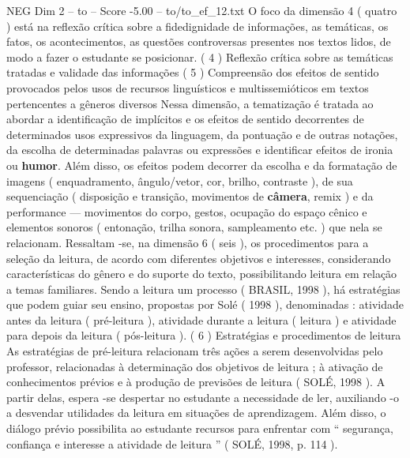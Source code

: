 \begin{textsample}{NEG Dim 2 – to – Score -5.00 – to/to\_ef\_12.txt}
O foco da dimensão 4 ( quatro ) está na reflexão crítica sobre a fidedignidade de informações, as temáticas, os fatos, os acontecimentos, as questões controversas presentes nos textos lidos, de modo a fazer o estudante se posicionar. ( 4 ) Reflexão crítica sobre as temáticas tratadas e validade das informações ( 5 ) Compreensão dos efeitos de sentido provocados pelos usos de recursos linguísticos e multissemióticos em textos pertencentes a gêneros diversos Nessa dimensão, a tematização é tratada ao abordar a identificação de implícitos e os efeitos de sentido decorrentes de determinados usos expressivos da linguagem, da pontuação e de outras notações, da escolha de determinadas palavras ou expressões e identificar efeitos de ironia ou \textbf{humor}.
Além disso, os efeitos podem decorrer da escolha e da formatação de imagens ( enquadramento, ângulo/vetor, cor, brilho, contraste ), de sua sequenciação ( disposição e transição, movimentos de \textbf{câmera}, remix ) e da performance — movimentos do corpo, gestos, ocupação do espaço cênico e elementos sonoros ( entonação, trilha sonora, sampleamento etc. ) que nela se relacionam.
Ressaltam -se, na dimensão 6 ( seis ), os procedimentos para a seleção da leitura, de acordo com diferentes objetivos e interesses, considerando características do gênero e do suporte do texto, possibilitando leitura em relação a temas familiares.
Sendo a leitura um processo ( BRASIL, 1998 ), há estratégias que podem guiar seu ensino, propostas por Solé ( 1998 ), denominadas : atividade antes da leitura ( pré-leitura ), atividade durante a leitura ( leitura ) e atividade para depois da leitura ( pós-leitura ). ( 6 ) Estratégias e procedimentos de leitura As estratégias de pré-leitura relacionam três ações a serem desenvolvidas pelo professor, relacionadas à determinação dos objetivos de leitura ; à ativação de conhecimentos prévios e à produção de previsões de leitura ( SOLÉ, 1998 ).
A partir delas, espera -se despertar no estudante a necessidade de ler, auxiliando -o a desvendar utilidades da leitura em situações de aprendizagem.
Além disso, o diálogo prévio possibilita ao estudante recursos para enfrentar com “ segurança, confiança e interesse a atividade de leitura ” ( SOLÉ, 1998, p. 114 ).

\end{textsample}
